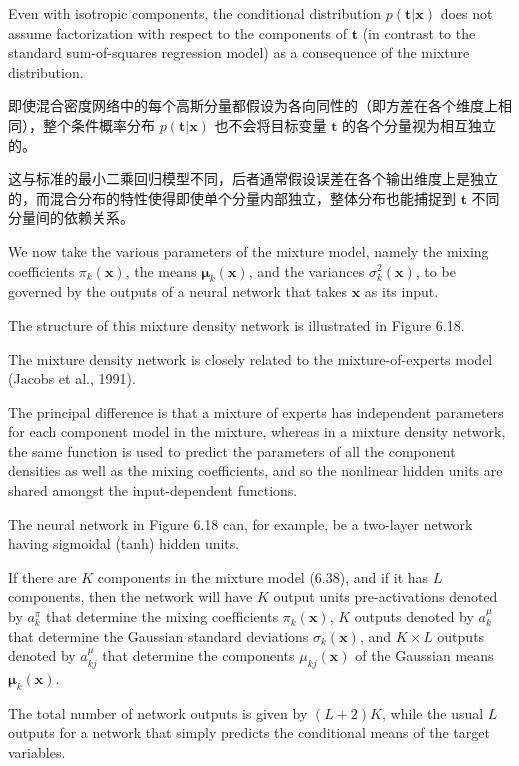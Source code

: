 \documentclass{article}
\begin{document}
Even with isotropic components, the conditional distribution $p(\mathbf{t}|\mathbf{x})$ does not assume factorization with respect to the components of $\mathbf{t}$ (in contrast to the standard sum-of-squares regression model) as a consequence of the mixture distribution.

{\color{red}
即使混合密度网络中的每个高斯分量都假设为各向同性的（即方差在各个维度上相同），整个条件概率分布 $p(\mathbf{t}|\mathbf{x})$ 也不会将目标变量 $\mathbf{t}$ 的各个分量视为相互独立的。

这与标准的最小二乘回归模型不同，后者通常假设误差在各个输出维度上是独立的，而混合分布的特性使得即使单个分量内部独立，整体分布也能捕捉到 $\mathbf{t}$ 不同分量间的依赖关系。
}

We now take the various parameters of the mixture model, namely the mixing coefficients $\pi_k(\mathbf{x})$, the means $\boldsymbol{\mu}_k(\mathbf{x})$, and the variances $\sigma_k^2(\mathbf{x})$, to be governed by the outputs of a neural network that takes $\mathbf{x}$ as its input. 

The structure of this mixture density network is illustrated in Figure 6.18. 

The mixture density network is closely related to the mixture-of-experts model (Jacobs et al., 1991). 

The principal difference is that a mixture of experts has independent parameters for each component model in the mixture, whereas in a mixture density network, the same function is used to predict the parameters of all the component densities as well as the mixing coefficients, and so the nonlinear hidden units are shared amongst the input-dependent functions.


The neural network in Figure 6.18 can, for example, be a two-layer network having sigmoidal (tanh) hidden units. 

If there are $K$ components in the mixture model (6.38), and if it has $L$ components, then the network will have $K$ output units pre-activations denoted by $a_k^\pi$ that determine the mixing coefficients $\pi_k(\mathbf{x})$, $K$ outputs denoted by $a_k^\mu$ that determine the Gaussian standard deviations $\sigma_k(\mathbf{x})$, and $K\times L$ outputs denoted by $a_{kj}^\mu$ that determine the components $\mu_{kj}(\mathbf{x})$ of the Gaussian means $\boldsymbol{\mu}_k(\mathbf{x})$. 

The total number of network outputs is given by $(L+2)K$, while the usual $L$ outputs for a network that simply predicts the conditional means of the target variables.
\end{document}
